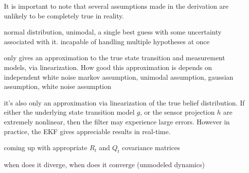 It is important to note that several assumptions made in the derivation are unlikely to be completely true in reality.

normal distribution, unimodal, a single best guess with some uncertainty associated with it. incapable of handling multiple hypotheses at once

only gives an approximation to the true state transition and measurement models, via linearization. How good this approximation is depends on 
\cite{probabilisticRobotics}
 independent white noise
markov assumption, unimodal assumption, gaussian assumption, white noise assumption

it's also only an approximation via linearization of the true belief distribution. If either the underlying state transition model \(g\), or the sensor projection \(h\) are extremely nonlinear, then the filter may experience large errors. However in practice, the EKF gives appreciable results in real-time.

coming up with appropriate \(R_t\) and \(Q_t\) covariance matrices

when does it diverge, when does it converge (unmodeled dynamics) \cite{}